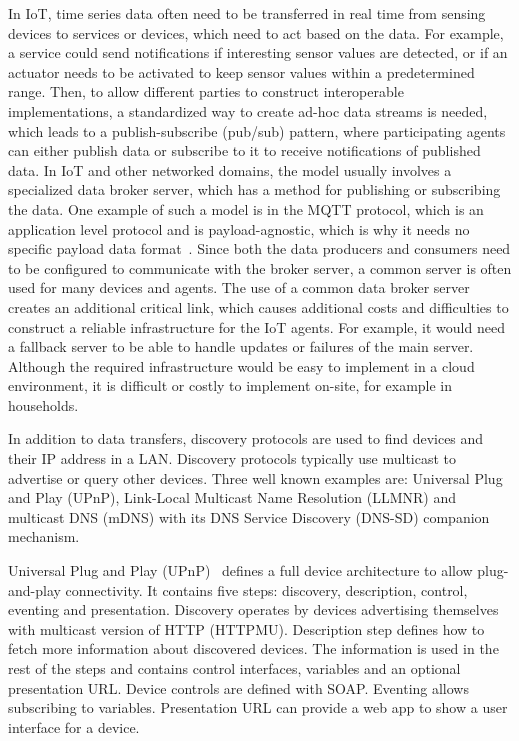 In IoT, time series data often need to be transferred in real time from sensing devices to services or devices, which need to act based on the data. For example, a service could send notifications if interesting sensor values are detected, or if an actuator needs to be activated to keep sensor values within a predetermined range. Then, to allow different parties to construct interoperable implementations, a standardized way to create ad-hoc data streams is needed, which leads to a publish-subscribe (pub/sub) pattern, where participating agents can either publish data or subscribe to it to receive notifications of published data. In IoT and other networked domains, the model usually involves a specialized data broker server, which has a method for publishing or subscribing the data. One example of such a model is in the MQTT protocol, which is an application level protocol and is payload-agnostic, which is why it needs no specific payload data format~\cite{MQTT}. Since both the data producers and consumers need to be configured to communicate with the broker server, a common server is often used for many devices and agents. The use of a common data broker server creates an additional critical link, which causes additional costs and difficulties to construct a reliable infrastructure for the IoT agents. For example, it would need a fallback server to be able to handle updates or failures of the main server. Although the required infrastructure would be easy to implement in a cloud environment, it is difficult or costly to implement on-site, for example in households.



In addition to data transfers, discovery protocols are used to find devices and their IP address in a LAN. Discovery protocols typically use multicast to advertise or query other devices. Three well known examples are: Universal Plug and Play (UPnP), Link-Local Multicast Name Resolution (LLMNR) and multicast DNS (mDNS) with its DNS Service Discovery (DNS-SD) companion mechanism.

Universal Plug and Play (UPnP)~\cite{UPnP_Device_Architecture} defines a full device architecture to allow plug-and-play connectivity. It contains five steps: discovery, description, control, eventing and presentation. Discovery operates by devices advertising themselves with multicast version of HTTP (HTTPMU). Description step defines how to fetch more information about discovered devices. The information is used in the rest of the steps and contains control interfaces, variables and an optional presentation URL. Device controls are defined with SOAP. Eventing allows subscribing to variables. Presentation URL can provide a web app to show a user interface for a device.

